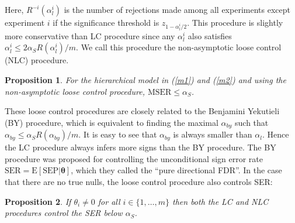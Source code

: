 \documentclass[11pt]{article}
\newtheorem{proposition}{Proposition}[section]
\begin{document}
Here, $R^{-i}(\alpha_l^i)$ is the number of rejections made 
among all experiments except experiment $i$ if the 
significance threshold is $z_{1-\alpha_l^{i}/2}$. 
This procedure is slightly more conservative than LC procedure since any $\alpha_l^i$ also satisfies $\alpha_l^i \leq 2\alpha_SR(\alpha_l^i)/m$. We call this procedure the non-asymptotic loose control (NLC) procedure.
\begin{proposition}
 For the hierarchical model in  (\ref{m1}) and (\ref{m2}) and using the non-asymptotic
loose control procedure, $\text{MSER}\leq \alpha_S$. 
	\label{prop:lcsmall}
\end{proposition}


These loose control procedures are closely related to the Benjamini Yekutieli (BY) \citep{Benjamini2005} procedure, which is equivalent to finding the maximal $\alpha_{by}$ such that $\alpha_{by} \leq \alpha_SR(\alpha_{by})/m$. It is easy to see that $\alpha_{by}$ is always smaller than $\alpha_{l}$. Hence the LC procedure always infers more signs than the BY procedure. The BY procedure was proposed for controlling the 
unconditional sign error rate $\text{SER}= \text{E}[\text{SEP}|\boldsymbol{\theta}]$, 
which they called the 
``pure directional FDR''. 
In the case that there are no true nulls, 
the loose control procedure also controls SER:
\begin{proposition}  
If $\theta_i\neq 0$ for all $i\in \{1,\ldots, m\}$ then both the LC and NLC procedures control the SER below $\alpha_S$. 
	\label{lemma:lcfdr}
\end{proposition}
\end{document}
